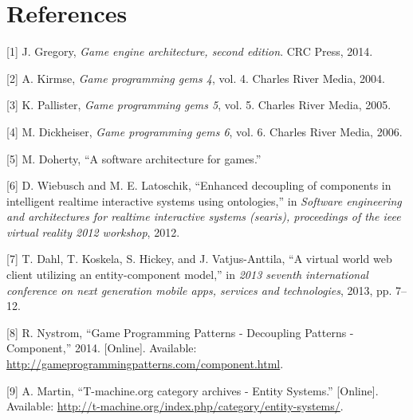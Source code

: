 \documentclass[oneside, 12pt, a4paper, openany]{book}
\begin{document}
\makeatletter
\renewcommand\listoffigures{%
} \makeatother

\listoffigures

\footnotesize
\clearpage
\pagestyle{plain} \fancyhf{} \lhead{} \chead{} \rhead{} \lfoot{}
\cfoot{} \rfoot{}

\chapter*{References}\label{references}

\hypertarget{refs}{}
\hypertarget{ref-gregory2014game}{}
{[}1{]} J. Gregory, \emph{Game engine architecture, second edition}. CRC
Press, 2014.

\hypertarget{ref-game_programming_gems_4}{}
{[}2{]} A. Kirmse, \emph{Game programming gems 4}, vol. 4. Charles River
Media, 2004.

\hypertarget{ref-game_programming_gems_5}{}
{[}3{]} K. Pallister, \emph{Game programming gems 5}, vol. 5. Charles
River Media, 2005.

\hypertarget{ref-game_programming_gems_6}{}
{[}4{]} M. Dickheiser, \emph{Game programming gems 6}, vol. 6. Charles
River Media, 2006.

\hypertarget{ref-doherty2003software}{}
{[}5{]} M. Doherty, ``A software architecture for games.''

\hypertarget{ref-Wiebusch:2012}{}
{[}6{]} D. Wiebusch and M. E. Latoschik, ``Enhanced decoupling of
components in intelligent realtime interactive systems using
ontologies,'' in \emph{Software engineering and architectures for
realtime interactive systems (searis), proceedings of the ieee virtual
reality 2012 workshop}, 2012.

\hypertarget{ref-6658092}{}
{[}7{]} T. Dahl, T. Koskela, S. Hickey, and J. Vatjus-Anttila, ``A
virtual world web client utilizing an entity-component model,'' in
\emph{2013 seventh international conference on next generation mobile
apps, services and technologies}, 2013, pp. 7--12.

\hypertarget{ref-robertnystorm_gpp_component}{}
{[}8{]} R. Nystrom, ``Game Programming Patterns - Decoupling Patterns -
Component,'' 2014. {[}Online{]}. Available:
\url{http://gameprogrammingpatterns.com/component.html}.

\hypertarget{ref-tmachine_es_category}{}
{[}9{]} A. Martin, ``T-machine.org category archives - Entity Systems.''
{[}Online{]}. Available:
\url{http://t-machine.org/index.php/category/entity-systems/}.
\end{document}
